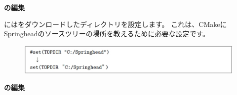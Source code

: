 \bigskip
\noindent
\bf{\CMakeTopdir{}}の編集
\begin{narrow}[20pt]
	\CMakeTopdir{}には\SprLib をダウンロードしたディレクトリを設定します。
	これは、CMakeにSpringheadのソースツリーの場所を教えるために必要な設定です。

\ifLwarp
	\begin{figure}[h]
	    \begin{center}
	    \includegraphics[width=\textwidth]{fig/command-3-1-b.eps}
	    \end{center}
	    \label{fig:DownloadTree}
	\end{figure}
\else
	\begin{narrow}[15pt]
	\end{narrow}
\fi
\end{narrow}
\medskip
\bf{\CMakeLists{}}の編集
